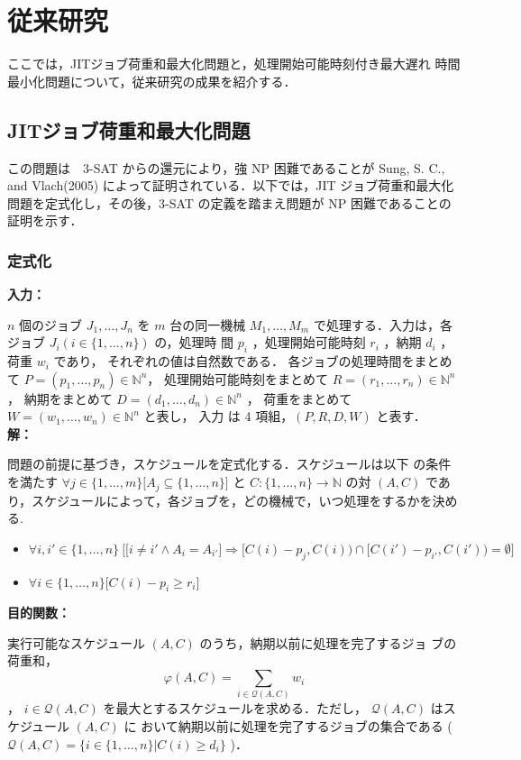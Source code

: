 \documentclass[12pt]{optlab-bachelor}
\begin{document}
\chapter{従来研究}
ここでは，JITジョブ荷重和最大化問題と，処理開始可能時刻付き最大遅れ
時間最小化問題について，従来研究の成果を紹介する．

\section{JITジョブ荷重和最大化問題}
この問題は　3-SAT からの還元により，強 NP 困難であることが Sung, S. C., and Vlach(2005) \cite{JIT}
によって証明されている．以下では，JIT ジョブ荷重和最大化問題を定式化し，その後，3-SAT の定義を踏まえ問題が NP 困難であることの証明を示す．

\subsection{定式化}
\noindent \textbf{入力：}

$n$ 個のジョブ $J_1,\ldots,J_n$ を $m$ 台の同一機械 $M_1,\ldots,M_m$
で処理する．入力は，各ジョブ $J_i ( i \in \{1,\ldots,n\} )$ の，処理時
間 $p_i$ ，処理開始可能時刻 $r_i$ ，納期 $d_i$ ，荷重 $w_i$ であり，
それぞれの値は自然数である．
各ジョブの処理時間をまとめて $P = (p_1,\ldots,p_n) \in \mathbb{N}^n$，
処理開始可能時刻をまとめて $R = (r_1,\ldots,r_n) \in \mathbb{N}^n$ ，
納期をまとめて $D = (d_1,\ldots,d_n) \in \mathbb{N}^n$ ，
荷重をまとめて $W = (w_1,\ldots,w_n) \in \mathbb{N}^n$ と表し，
入力 は 4 項組，$(P,R,D,W)$ と表す．\\

\noindent \textbf{解：}

問題の前提に基づき，スケジュールを定式化する．スケジュールは以下
の条件を満たす $\forall j \in \{1,\ldots,m\}\big[A_j \subseteq
\{1,\ldots,n\}\big]$ と $C : \{1,\ldots,n\} \to \mathbb{N}$ の対 $(A,
C)$ であり，スケジュールによって，各ジョブを，どの機械で，いつ処理をするかを決める.
\begin{itemize}
  \item $\forall i, i' \in \{1,\ldots,n\}\ \Big[ \big[i \neq i' \land A_i =
  A_{i'}\big] \Rightarrow [C(i) - p_j, C(i)) \cap [C(i') - p_{i'}, C(i')) = \emptyset \Big]$
  \item  $\forall i \in \{1,\ldots,n\}\big[C(i) - p_i \ge r_i\big]$
\end{itemize}

\noindent \textbf{目的関数：}

実行可能なスケジュール $(A, C)$ のうち，納期以前に処理を完了するジョ
ブの荷重和，
$$\displaystyle \varphi(A,C) = \sum_{i \in \mathcal{Q}(A,C)}w_i$$，
$i \in \mathcal{Q}(A,C)$ を最大とするスケジュールを求める．ただし，
$\mathcal{Q}(A, C)$ はスケジュール $(A, C)$ に
おいて納期以前に処理を完了するジョブの集合である (
$\mathcal{Q}(A, C) = \{i \in \{1,\ldots, n\} | C(i) \ge d_i \}$ )．
\end{document}
